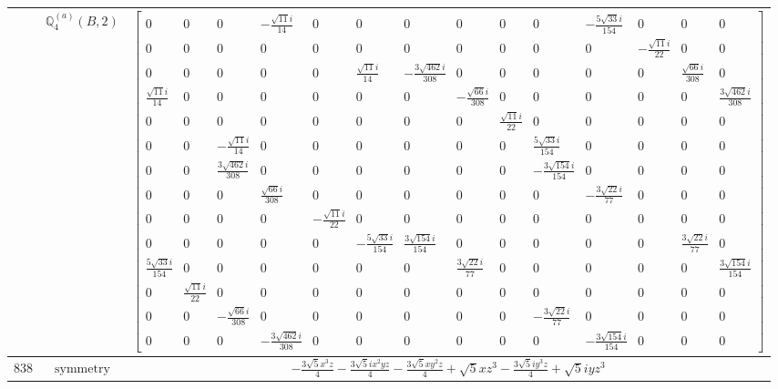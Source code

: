 \documentclass[fleqn,8pt,landscape]{jsarticle}
\begin{document}
\begin{longtable}{ccc}
$  $ & $ \mathbb{Q}_{4}^{(a)}(B,2) $ & $ \begin{bmatrix} 0 & 0 & 0 & - \frac{\sqrt{11} i}{14} & 0 & 0 & 0 & 0 & 0 & 0 & - \frac{5 \sqrt{33} i}{154} & 0 & 0 & 0 \\ 0 & 0 & 0 & 0 & 0 & 0 & 0 & 0 & 0 & 0 & 0 & - \frac{\sqrt{11} i}{22} & 0 & 0 \\ 0 & 0 & 0 & 0 & 0 & \frac{\sqrt{11} i}{14} & - \frac{3 \sqrt{462} i}{308} & 0 & 0 & 0 & 0 & 0 & \frac{\sqrt{66} i}{308} & 0 \\ \frac{\sqrt{11} i}{14} & 0 & 0 & 0 & 0 & 0 & 0 & - \frac{\sqrt{66} i}{308} & 0 & 0 & 0 & 0 & 0 & \frac{3 \sqrt{462} i}{308} \\ 0 & 0 & 0 & 0 & 0 & 0 & 0 & 0 & \frac{\sqrt{11} i}{22} & 0 & 0 & 0 & 0 & 0 \\ 0 & 0 & - \frac{\sqrt{11} i}{14} & 0 & 0 & 0 & 0 & 0 & 0 & \frac{5 \sqrt{33} i}{154} & 0 & 0 & 0 & 0 \\ 0 & 0 & \frac{3 \sqrt{462} i}{308} & 0 & 0 & 0 & 0 & 0 & 0 & - \frac{3 \sqrt{154} i}{154} & 0 & 0 & 0 & 0 \\ 0 & 0 & 0 & \frac{\sqrt{66} i}{308} & 0 & 0 & 0 & 0 & 0 & 0 & - \frac{3 \sqrt{22} i}{77} & 0 & 0 & 0 \\ 0 & 0 & 0 & 0 & - \frac{\sqrt{11} i}{22} & 0 & 0 & 0 & 0 & 0 & 0 & 0 & 0 & 0 \\ 0 & 0 & 0 & 0 & 0 & - \frac{5 \sqrt{33} i}{154} & \frac{3 \sqrt{154} i}{154} & 0 & 0 & 0 & 0 & 0 & \frac{3 \sqrt{22} i}{77} & 0 \\ \frac{5 \sqrt{33} i}{154} & 0 & 0 & 0 & 0 & 0 & 0 & \frac{3 \sqrt{22} i}{77} & 0 & 0 & 0 & 0 & 0 & \frac{3 \sqrt{154} i}{154} \\ 0 & \frac{\sqrt{11} i}{22} & 0 & 0 & 0 & 0 & 0 & 0 & 0 & 0 & 0 & 0 & 0 & 0 \\ 0 & 0 & - \frac{\sqrt{66} i}{308} & 0 & 0 & 0 & 0 & 0 & 0 & - \frac{3 \sqrt{22} i}{77} & 0 & 0 & 0 & 0 \\ 0 & 0 & 0 & - \frac{3 \sqrt{462} i}{308} & 0 & 0 & 0 & 0 & 0 & 0 & - \frac{3 \sqrt{154} i}{154} & 0 & 0 & 0 \end{bmatrix} $ \\ \hline
$ 838 $ & $ \text{symmetry} $ & $ - \frac{3 \sqrt{5} x^{3} z}{4} - \frac{3 \sqrt{5} i x^{2} y z}{4} - \frac{3 \sqrt{5} x y^{2} z}{4} + \sqrt{5} x z^{3} - \frac{3 \sqrt{5} i y^{3} z}{4} + \sqrt{5} i y z^{3} $ \\

\end{longtable}
\end{document}
